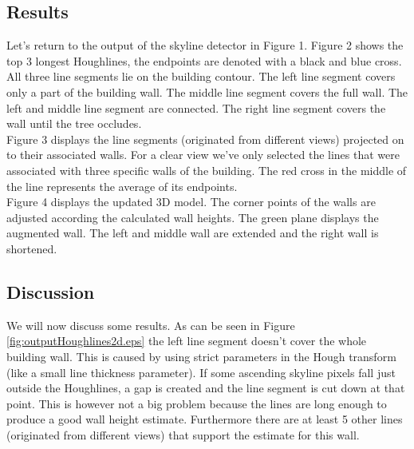 \documentclass[10pt]{article}
\begin{document}
{\subsection{Results}
\noindent
{}
Let's return to the output of the skyline detector in Figure 1.
Figure 2
shows the top 3 longest Houghlines, the
endpoints are denoted with a black and blue cross. All three line segments lie on the
building contour.  The left line segment covers only a part of the building wall. The
middle line segment covers the full wall. The left and middle line segment are connected. The
right line segment covers the wall until the tree occludes.\\

Figure %
3 displays the line segments (originated from
different views) projected on to their associated walls.  For a clear view we've
only selected the lines that were associated with three specific walls of the building.  
The red cross in the middle of the line represents the average of its endpoints.\\

Figure 4 %
displays the updated 3D model. The
corner points of the walls are adjusted according the calculated wall heights.
The green plane displays the augmented wall. The left and middle wall are extended
and the right wall is shortened.\\


\subsection{Discussion}
We will now discuss some results. As can be seen in Figure
\ref{fig:outputHoughlines2d.eps} the left line segment doesn't cover the whole
building wall. This is caused by using strict parameters in the Hough transform
(like a small line thickness parameter).  If some ascending skyline pixels fall just outside
the Houghlines, a gap is created and the line segment is cut down at that point.
This is however not a big problem because the lines are long enough to produce a
good wall height estimate. Furthermore there are at least 5 other lines
(originated from different views) that support the estimate for this wall.\\



}
\end{document}
